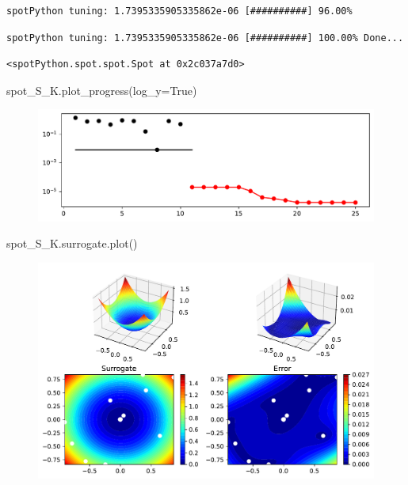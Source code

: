 \documentclass[
  letterpaper,
  DIV=11,
  numbers=noendperiod]{scrreprt}
\newenvironment{Shaded}{\begin{snugshade}}{\end{snugshade}}
\newcommand{\NormalTok}[1]{\textcolor[rgb]{0.00,0.23,0.31}{#1}}
\newcommand{\OperatorTok}[1]{\textcolor[rgb]{0.37,0.37,0.37}{#1}}
\newcommand{\VariableTok}[1]{\textcolor[rgb]{0.07,0.07,0.07}{#1}}
\begin{document}
\begin{verbatim}
spotPython tuning: 1.7395335905335862e-06 [##########] 96.00% 
\end{verbatim}

\begin{verbatim}
spotPython tuning: 1.7395335905335862e-06 [##########] 100.00% Done...
\end{verbatim}

\begin{verbatim}
<spotPython.spot.spot.Spot at 0x2c037a7d0>
\end{verbatim}

\begin{Shaded}
\begin{Highlighting}[]
\NormalTok{spot\_S\_K.plot\_progress(log\_y}\OperatorTok{=}\VariableTok{True}\NormalTok{)}
\end{Highlighting}
\end{Shaded}

\begin{figure}[H]

{\centering \includegraphics{07_spot_ei_files/figure-pdf/cell-40-output-1.pdf}

}

\end{figure}

\begin{Shaded}
\begin{Highlighting}[]
\NormalTok{spot\_S\_K.surrogate.plot()}
\end{Highlighting}
\end{Shaded}

\begin{figure}[H]

{\centering \includegraphics{07_spot_ei_files/figure-pdf/cell-41-output-1.pdf}

}

\end{figure}
\end{document}
